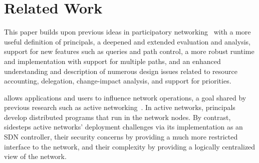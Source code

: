

\chapter{Related Work}
\label{sec:related-work}



This paper builds upon previous ideas in participatory
networking~\cite{Ferguson:2012a} with a more useful definition of
principals, a deepened and extended evaluation and analysis, support
for new features such as queries and path control, a more robust
runtime and implementation with support for multiple paths, and an
enhanced understanding and description of numerous design issues
related to resource accounting, delegation, change-impact analysis,
and support for priorities.

%
\sys allows applications and users to influence
network operations, a goal shared by previous research such as
active networking~\cite{ActiveNetworking}. In active networks, principals
develop distributed programs that run in the network nodes. By contrast,
\sys sidesteps active networks' deployment challenges via its implementation
as an SDN controller, their security concerns by providing a much more restricted
interface to the network, and their complexity by providing a logically centralized
view of the network.

